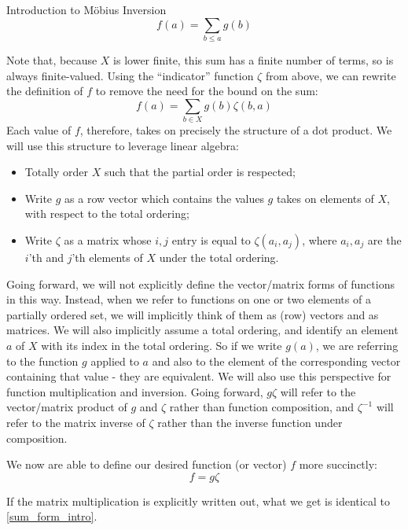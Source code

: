 \documentclass[12pt]{pom_thesis}
\begin{document}
\begin{chapter}{Introduction to M\"obius Inversion}
\[
f(a) = \sum_{b \leq a}g(b)
\]

Note that, because $X$ is lower finite, this sum has a finite number of terms, so is always finite-valued. Using the ``indicator'' function $\zeta$ from above, we can rewrite the definition of $f$ to remove the need for the bound on the sum:
\begin{equation}\label{sum_form_intro}
f(a) = \sum_{b \in X}g(b)\zeta(b,a)
\end{equation}
Each value of $f$, therefore, takes on precisely the structure of a dot product. We will use this structure to leverage linear algebra: 
\begin{itemize}
\item Totally order $X$ such that the partial order is respected;
\item Write $g$ as a row vector which contains the values $g$ takes on elements of $X$, with respect to the total ordering;
\item Write $\zeta$ as a matrix whose $i,j$ entry is equal to $\zeta(a_i, a_j)$, where $a_i, a_j$ are the $i$'th and $j$'th elements of $X$ under the total ordering.
\end{itemize}

Going forward, we will not explicitly define the vector/matrix forms of functions in this way. Instead, when we refer to functions on one or two elements of a partially ordered set, we will implicitly think of them as (row) vectors and as matrices. We will also implicitly assume a total ordering, and identify an element $a$ of $X$ with its index in the total ordering. So if we write $g(a)$, we are referring to the function $g$ applied to $a$ and also to the element of the corresponding vector containing that value - they are equivalent. We will also use this perspective for function multiplication and inversion. Going forward, $g\zeta$ will refer to the vector/matrix product of $g$ and $\zeta$ rather than function composition, and $\zeta^{-1}$ will refer to the matrix inverse of $\zeta$ rather than the inverse function under composition.

We now are able to define our desired function (or vector) $f$ more succinctly:
\[
f = g \zeta
\]

If the matrix multiplication is explicitly written out, what we get is identical to \eqref{sum_form_intro}.


\end{chapter}
\end{document}

